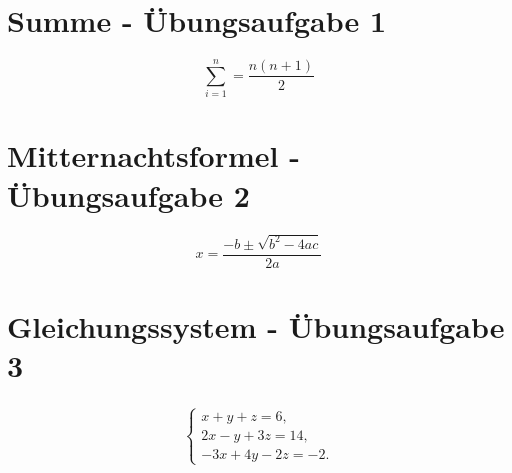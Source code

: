 \documentclass{scrartcl}
\begin{document}
\section{Summe - Übungsaufgabe 1}

\begin{equation}\label{eqn:summe}
 \sum_{i=1}^n=\frac{n(n+1)}{2}
\end{equation}


\section{Mitternachtsformel - Übungsaufgabe 2}

\begin{equation}
x=\frac{-b\pm \sqrt{b^2-4ac}}{2a}
\end{equation}

\section{Gleichungssystem - Übungsaufgabe 3}

\begin{align}
\left\{ 
\begin{array}{l}
x + y + z = 6, \\
2x - y + 3z = 14, \\
-3x + 4y - 2z = -2.
\end{array}
\right.
\end{align}
\end{document}
